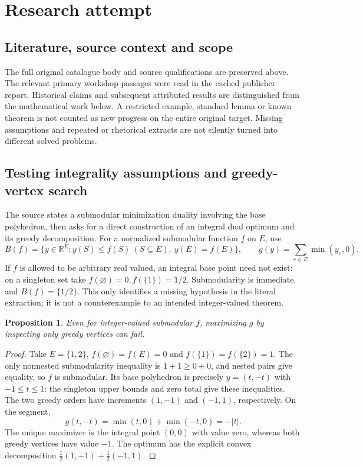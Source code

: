 \documentclass[11pt]{article}
\newtheorem{proposition}{Proposition}
\begin{document}
\section{Research attempt}
\subsection{Literature, source context and scope}
The full original catalogue body and source qualifications are preserved above. The relevant primary workshop passages were read in the cached publisher report. Historical claims and subsequent attributed results are distinguished from the mathematical work below. A restricted example, standard lemma or known theorem is not counted as new progress on the entire original target. Missing assumptions and repeated or rhetorical extracts are not silently turned into different solved problems.

\subsection{Testing integrality assumptions and greedy-vertex search}
The source states a submodular minimization duality involving the base polyhedron, then asks for a direct construction of an integral dual optimum and its greedy decomposition. For a normalized submodular function $f$ on $E$, use
\[
B(f)=\{y\in\mathbb R^E:y(S)\le f(S)\ (S\subseteq E),\ y(E)=f(E)\},
\qquad g(y)=\sum_{e\in E}\min(y_e,0).
\]
If $f$ is allowed to be arbitrary real valued, an integral base point need not exist: on a singleton set take $f(\varnothing)=0,f(\{1\})=1/2$. Submodularity is immediate, and $B(f)=\{1/2\}$. This only identifies a missing hypothesis in the literal extraction; it is not a counterexample to an intended integer-valued theorem.
\begin{proposition}
Even for integer-valued submodular $f$, maximizing $g$ by inspecting only greedy vertices can fail.
\end{proposition}
\begin{proof}
Take $E=\{1,2\}$, $f(\varnothing)=f(E)=0$ and $f(\{1\})=f(\{2\})=1$. The only nonnested submodularity inequality is $1+1\ge0+0$, and nested pairs give equality, so $f$ is submodular. Its base polyhedron is precisely $y=(t,-t)$ with $-1\le t\le1$: the singleton upper bounds and zero total give these inequalities. The two greedy orders have increments $(1,-1)$ and $(-1,1)$, respectively. On the segment,
\[
g(t,-t)=\min(t,0)+\min(-t,0)=-|t|.
\]
The unique maximizer is the integral point $(0,0)$ with value zero, whereas both greedy vertices have value $-1$. The optimum has the explicit convex decomposition $\frac12(1,-1)+\frac12(-1,1)$.
\end{proof}
\end{document}
